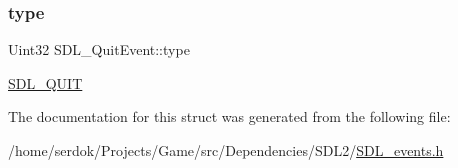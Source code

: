 \subsubsection{\texorpdfstring{type}{type}}
{\footnotesize\ttfamily Uint32 S\+D\+L\+\_\+\+Quit\+Event\+::type}

\hyperlink{SDL__events_8h_a3b589e89be6b35c02e0dd34a55f3fccaa31acc5fdafc86ebe2c1f5c3cae48d603}{S\+D\+L\+\_\+\+Q\+U\+IT} 

The documentation for this struct was generated from the following file\+:\begin{DoxyCompactItemize}
\item 
/home/serdok/\+Projects/\+Game/src/\+Dependencies/\+S\+D\+L2/\hyperlink{SDL__events_8h}{S\+D\+L\+\_\+events.\+h}\end{DoxyCompactItemize}
